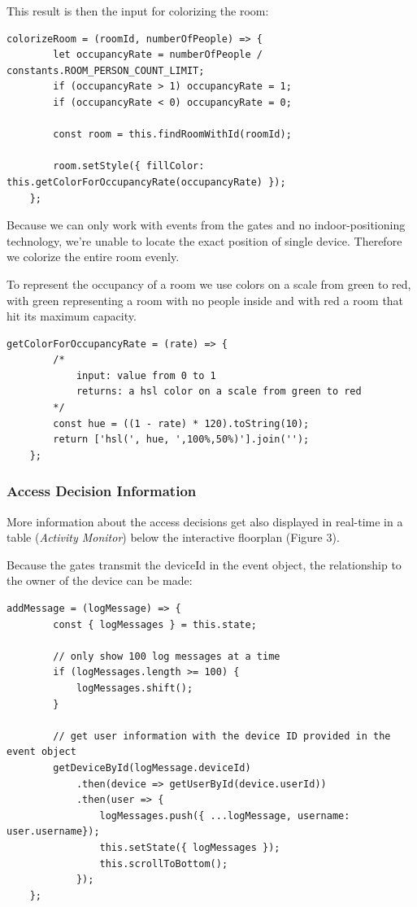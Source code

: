 This result is then the input for colorizing the room:

\begin{lstlisting}[label=colorizeRoom]
	colorizeRoom = (roomId, numberOfPeople) => {
        let occupancyRate = numberOfPeople / constants.ROOM_PERSON_COUNT_LIMIT;
        if (occupancyRate > 1) occupancyRate = 1;
        if (occupancyRate < 0) occupancyRate = 0;

        const room = this.findRoomWithId(roomId);

        room.setStyle({ fillColor: this.getColorForOccupancyRate(occupancyRate) });
    };
\end{lstlisting}

Because we can only work with events from the gates and no indoor-positioning technology, we're unable to locate the exact position of single device. Therefore we colorize the entire room evenly.

To represent the occupancy of a room we use colors on a scale from green to red, with green representing a room with no people inside and with red a room that hit its maximum capacity. 

\begin{lstlisting}[label=getColorForOccupancyRate]
    getColorForOccupancyRate = (rate) => {
        /*
            input: value from 0 to 1
            returns: a hsl color on a scale from green to red
        */
        const hue = ((1 - rate) * 120).toString(10);
        return ['hsl(', hue, ',100%,50%)'].join('');
    };
\end{lstlisting}

\subsubsection{Access Decision Information}

More information about the access decisions get also displayed in real-time in a table (\emph{Activity Monitor}) below the interactive floorplan (Figure 3).

Because the gates transmit the deviceId in the event object, the relationship to the owner of the device can be made:

\begin{lstlisting}[label=addMessage]
addMessage = (logMessage) => {
        const { logMessages } = this.state;
        
        // only show 100 log messages at a time
        if (logMessages.length >= 100) {
            logMessages.shift();
        }

		// get user information with the device ID provided in the event object
        getDeviceById(logMessage.deviceId)
            .then(device => getUserById(device.userId))
            .then(user => {
                logMessages.push({ ...logMessage, username: user.username});
                this.setState({ logMessages });
                this.scrollToBottom();
            });
    };
\end{lstlisting}

